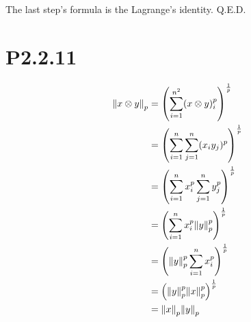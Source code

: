 \documentclass{article}
\begin{document}
The last step's formula is the Lagrange's identity. Q.E.D.

\section*{P2.2.11}
\begin{align*}
    \norm{x\otimes y}_p
     & = \left(\sum_{i=1}^{n^2}(x\otimes y)_i^p\right)^\frac{1}{p}   \\
     & = \left(\sum_{i=1}^n\sum_{j=1}^n(x_iy_j)^p\right)^\frac{1}{p} \\
     & = \left(\sum_{i=1}^nx_i^p\sum_{j=1}^ny_j^p\right)^\frac{1}{p} \\
     & = \left(\sum_{i=1}^nx_i^p\norm{y}_p^p\right)^\frac{1}{p}      \\
     & = \left(\norm{y}_p^p\sum_{i=1}^nx_i^p\right)^\frac{1}{p}      \\
     & =\left(\norm{y}_p^p\norm{x}_p^p\right)^\frac{1}{p}            \\
     & = \norm{x}_p\norm{y}_p
\end{align*}
\end{document}
